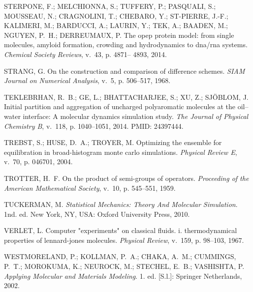 \documentclass[
	12pt,				%
	openany,			%
	oneside,			%
	a4paper,			%
	english,			%
	brazil				%
	]{abntex2}
\begin{document}
\begin{thebibliography}{}
{STERPONE, F.; MELCHIONNA, S.; TUFFERY, P.; PASQUALI, S.; MOUSSEAU, N.;
  CRAGNOLINI, T.; CHEBARO, Y.; ST-PIERRE, J.-F.; KALIMERI, M.; BARDUCCI, A.;
  LAURIN, Y.; TEK, A.; BAADEN, M.; NGUYEN, P.~H.; DERREUMAUX, P. The opep
  protein model: from single molecules, amyloid formation, crowding and
  hydrodynamics to dna/rna systems.
\emph{Chemical Society Reviews}, v.~43, p. 4871– 4893, 2014.}

{STRANG, G. On the construction and comparison of difference schemes.
\emph{SIAM Journal on Numerical Analysis}, v.~5, p. 506--517, 1968.}

{TEKLEBRHAN, R.~B.; GE, L.; BHATTACHARJEE, S.; XU, Z.; SJ\"{O}BLOM, J. Initial
  partition and aggregation of uncharged polyaromatic molecules at the
  oil–water interface: A molecular dynamics simulation study.
\emph{The Journal of Physical Chemistry B}, v.~118, p. 1040--1051, 2014.
PMID: 24397444.}

{TREBST, S.; HUSE, D.~A.; TROYER, M. Optimizing the ensemble for equilibration
  in broad-histogram monte carlo simulations.
\emph{Physical Review E}, v.~70, p. 046701, 2004.}

{TROTTER, H.~F. On the product of semi-groups of operators.
\emph{Proceeding of the American Mathematical Society}, v.~10, p. 545--551,
  1959.}

{TUCKERMAN, M. \emph{Statistical Mechanics: Theory And Molecular Simulation}.
  1nd. ed. New York, NY, USA: Oxford University Press, 2010.}

{VERLET, L. Computer "experiments" on classical fluids. i. thermodynamical
  properties of lennard-jones molecules.
\emph{Physical Review}, v.~159, p. 98--103, 1967.}

{WESTMORELAND, P.; KOLLMAN, P.~A.; CHAKA, A.~M.; CUMMINGS, P.~T.; MOROKUMA, K.;
  NEUROCK, M.; STECHEL, E.~B.; VASHISHTA, P. \emph{Applying Molecular and
  Materials Modeling}. 1. ed. [S.l.]: Springer Netherlands, 2002.}


\end{thebibliography}
\end{document}
